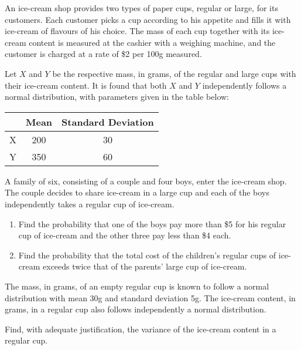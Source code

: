 \begin{problem}
    An ice-cream shop provides two types of paper cups, regular or large, for its customers. Each customer picks a cup according to his appetite and fills it with ice-cream of flavours of his choice. The mass of each cup together with its ice-cream content is measured at the cashier with a weighing machine, and the customer is charged at a rate of \$2 per 100g measured.

    Let $X$ and $Y$ be the respective mass, in grams, of the regular and large cups with their ice-cream content. It is found that both $X$ and $Y$ independently follows a normal distribution, with parameters given in the table below:

    \begin{table}[H]
        \centering
        \begin{tabular}{|c|c|c|}
        \hline
         & Mean & Standard Deviation \\ \hline
        X & 200 & 30 \\ \hline
        Y & 350 & 60 \\ \hline
        \end{tabular}
    \end{table}
    
    A family of six, consisting of a couple and four boys, enter the ice-cream shop. The couple decides to share ice-cream in a large cup and each of the boys independently takes a regular cup of ice-cream.

    \begin{enumerate}
        \item Find the probability that one of the boys pay more than \$5 for his regular cup of ice-cream and the other three pay less than \$4 each.
        \item Find the probability that the total cost of the children's regular cups of ice-cream exceeds twice that of the parents' large cup of ice-cream.
    \end{enumerate}

    The mass, in grams, of an empty regular cup is known to follow a normal distribution with mean 30g and standard deviation 5g. The ice-cream content, in grams, in a regular cup also follows independently a normal distribution.

    Find, with adequate justification, the variance of the ice-cream content in a regular cup.
\end{problem}
